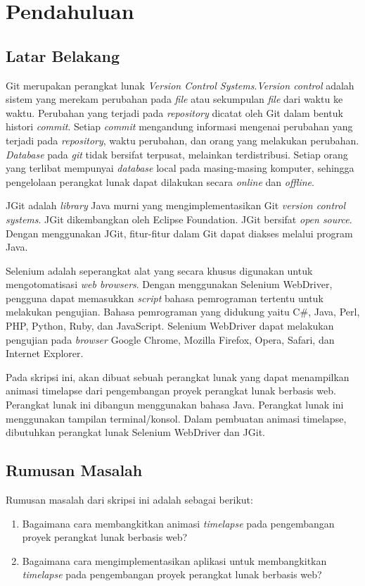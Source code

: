 \chapter{Pendahuluan}
\label{chap:intro}
   
\section{Latar Belakang}
\label{sec:label}
Git merupakan perangkat lunak \textit{Version Control Systems}\cite{chacon2014pro}.\textit{Version control} adalah sistem yang merekam perubahan pada \textit{file} atau sekumpulan \textit{file} dari waktu ke waktu. Perubahan yang terjadi pada \textit{repository} dicatat oleh Git dalam bentuk histori \textit{commit}. Setiap \textit{commit} mengandung informasi mengenai perubahan yang terjadi pada \textit{repository}, waktu perubahan, dan orang yang melakukan perubahan. \textit{Database} pada \textit{git} tidak bersifat terpusat, melainkan terdistribusi. Setiap orang yang terlibat mempunyai \textit{database} local pada masing-masing komputer, sehingga pengelolaan perangkat lunak dapat dilakukan secara \textit{online} dan \textit{offline}.

JGit adalah \textit{library} Java murni yang mengimplementasikan Git \textit{version control systems}\cite{JGit}. JGit dikembangkan oleh Eclipse Foundation. JGit bersifat \textit{open source}. Dengan menggunakan JGit, fitur-fitur dalam Git dapat diakses melalui program Java. 

Selenium adalah seperangkat alat yang secara khusus digunakan untuk mengotomatisasi \textit{web browsers}\cite{Selenium}. Dengan menggunakan Selenium WebDriver, pengguna dapat memasukkan \textit{script} bahasa pemrograman tertentu untuk melakukan pengujian. Bahasa pemrograman yang didukung yaitu C\#, Java, Perl, PHP, Python, Ruby, dan JavaScript. Selenium WebDriver dapat melakukan pengujian pada \textit{browser} Google Chrome, Mozilla Firefox, Opera, Safari, dan Internet Explorer.  
  
Pada skripsi ini, akan dibuat sebuah perangkat lunak yang dapat menampilkan animasi timelapse dari pengembangan proyek perangkat lunak berbasis web. Perangkat lunak ini dibangun menggunakan bahasa Java. Perangkat lunak ini menggunakan tampilan terminal/konsol. Dalam pembuatan animasi timelapse, dibutuhkan perangkat lunak Selenium WebDriver dan JGit.

\section{Rumusan Masalah}
\label{sec:rumusan}
Rumusan masalah dari skripsi ini adalah sebagai berikut:
\begin{enumerate}
	\item Bagaimana cara membangkitkan animasi \textit{timelapse} pada pengembangan proyek perangkat lunak berbasis web?
	\item Bagaimana cara mengimplementasikan aplikasi untuk membangkitkan \textit{timelapse} pada pengembangan proyek perangkat lunak berbasis web?
\end{enumerate}

